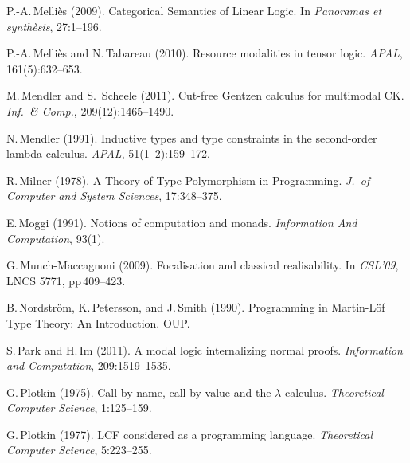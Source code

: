 \documentclass[11pt,twocolumn]{article}
\newcommand{\hide}[1]{}
\begin{document}
{\begin{thebibliography}{000}
P.-A.\,Melli\`es (2009).
\newblock Categorical Semantics of Linear Logic.
\newblock In \emph{Panoramas et synth\`esis}, 27:1--196.

P.-A.\,Melli\`es and N.\,Tabareau (2010).
\newblock Resource modalities in tensor logic.
\newblock \emph{APAL}, 161(5):632--653.

M.\,Mendler and S.\, Scheele (2011).
\newblock Cut-free Gentzen calculus for multimodal CK.
\newblock \emph{Inf.\ \& Comp.}, 209(12):1465--1490.

N.\,Mendler (1991). 
\newblock Inductive types and type constraints in the second-order lambda
calculus. 
\newblock \emph{APAL}, 51(1--2):159--172.

R.\,Milner (1978).
\newblock A Theory of Type Polymorphism in Programming.
\newblock \emph{J.\ of Computer and System Sciences}, 17:348--375.

E.\,Moggi (1991).
\newblock Notions of computation and monads. 
\newblock \emph{Information And Computation}, 93(1).

G.\,Munch-Maccagnoni (2009).
\newblock Focalisation and classical realisability.
\newblock In \emph{CSL'09}, LNCS 5771, pp\,409--423.

B.\,Nordstr\"om, K.\,Petersson, and J.\,Smith (1990).
\newblock Programming in Martin-L\"of Type Theory: An Introduction.
\newblock OUP.

S.\,Park and H.\,Im (2011).
\newblock A modal logic internalizing normal proofs.
\newblock \emph{Information and Computation}, 209:1519--1535.

\hide{
\bibitem{Pierce}
B.\,Pierce (2002).
\newblock \emph{Types and programming languages}.
}

G.\,Plotkin (1975).
\newblock Call-by-name, call-by-value and the \mbox{$\lambda$-calculus}.
\newblock \emph{Theoretical Computer Science}, 1:125--159.

G.\,Plotkin (1977).
\newblock LCF considered as a programming language.
\newblock \emph{Theoretical Computer Science}, 5:223--255.


\end{thebibliography}}
\end{document}
